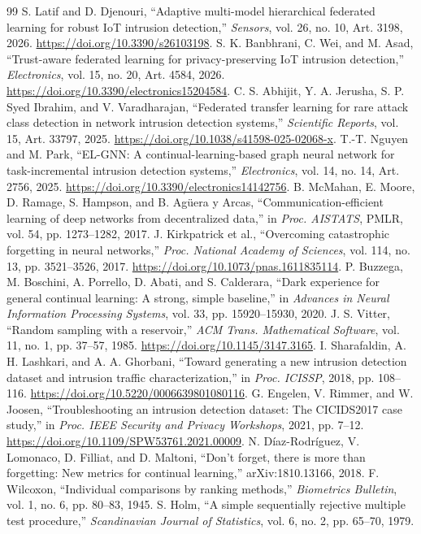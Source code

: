 \documentclass[10pt,a4paper]{article}
\begin{document}
\begin{thebibliography}{99}
 S. Latif and D. Djenouri, \enquote{Adaptive multi-model hierarchical federated learning for robust IoT intrusion detection,} \emph{Sensors}, vol. 26, no. 10, Art. 3198, 2026. \url{https://doi.org/10.3390/s26103198}.
 S. K. Banbhrani, C. Wei, and M. Asad, \enquote{Trust-aware federated learning for privacy-preserving IoT intrusion detection,} \emph{Electronics}, vol. 15, no. 20, Art. 4584, 2026. \url{https://doi.org/10.3390/electronics15204584}.
 C. S. Abhijit, Y. A. Jerusha, S. P. Syed Ibrahim, and V. Varadharajan, \enquote{Federated transfer learning for rare attack class detection in network intrusion detection systems,} \emph{Scientific Reports}, vol. 15, Art. 33797, 2025. \url{https://doi.org/10.1038/s41598-025-02068-x}.
 T.-T. Nguyen and M. Park, \enquote{EL-GNN: A continual-learning-based graph neural network for task-incremental intrusion detection systems,} \emph{Electronics}, vol. 14, no. 14, Art. 2756, 2025. \url{https://doi.org/10.3390/electronics14142756}.
 B. McMahan, E. Moore, D. Ramage, S. Hampson, and B. Ag\"uera y Arcas, \enquote{Communication-efficient learning of deep networks from decentralized data,} in \emph{Proc. AISTATS}, PMLR, vol. 54, pp. 1273--1282, 2017.
 J. Kirkpatrick et al., \enquote{Overcoming catastrophic forgetting in neural networks,} \emph{Proc. National Academy of Sciences}, vol. 114, no. 13, pp. 3521--3526, 2017. \url{https://doi.org/10.1073/pnas.1611835114}.
 P. Buzzega, M. Boschini, A. Porrello, D. Abati, and S. Calderara, \enquote{Dark experience for general continual learning: A strong, simple baseline,} in \emph{Advances in Neural Information Processing Systems}, vol. 33, pp. 15920--15930, 2020.
 J. S. Vitter, \enquote{Random sampling with a reservoir,} \emph{ACM Trans. Mathematical Software}, vol. 11, no. 1, pp. 37--57, 1985. \url{https://doi.org/10.1145/3147.3165}.
 I. Sharafaldin, A. H. Lashkari, and A. A. Ghorbani, \enquote{Toward generating a new intrusion detection dataset and intrusion traffic characterization,} in \emph{Proc. ICISSP}, 2018, pp. 108--116. \url{https://doi.org/10.5220/0006639801080116}.
 G. Engelen, V. Rimmer, and W. Joosen, \enquote{Troubleshooting an intrusion detection dataset: The CICIDS2017 case study,} in \emph{Proc. IEEE Security and Privacy Workshops}, 2021, pp. 7--12. \url{https://doi.org/10.1109/SPW53761.2021.00009}.
 N. D\'iaz-Rodr\'iguez, V. Lomonaco, D. Filliat, and D. Maltoni, \enquote{Don't forget, there is more than forgetting: New metrics for continual learning,} arXiv:1810.13166, 2018.
 F. Wilcoxon, \enquote{Individual comparisons by ranking methods,} \emph{Biometrics Bulletin}, vol. 1, no. 6, pp. 80--83, 1945.
 S. Holm, \enquote{A simple sequentially rejective multiple test procedure,} \emph{Scandinavian Journal of Statistics}, vol. 6, no. 2, pp. 65--70, 1979.
\end{thebibliography}
\end{document}
